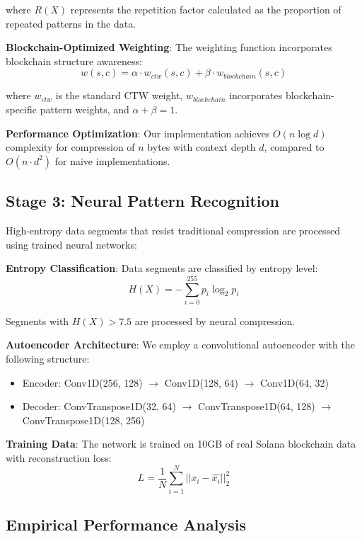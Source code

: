 \documentclass[11pt,a4paper]{article}
\begin{document}
where $R(X)$ represents the repetition factor calculated as the proportion of repeated patterns in the data.

\textbf{Blockchain-Optimized Weighting}: The weighting function incorporates blockchain structure awareness:
\begin{equation}
w(s, c) = \alpha \cdot w_{ctw}(s, c) + \beta \cdot w_{blockchain}(s, c)
\end{equation}

where $w_{ctw}$ is the standard CTW weight, $w_{blockchain}$ incorporates blockchain-specific pattern weights, and $\alpha + \beta = 1$.

\textbf{Performance Optimization}: Our implementation achieves $O(n \log d)$ complexity for compression of $n$ bytes with context depth $d$, compared to $O(n \cdot d^2)$ for naive implementations.

\subsection{Stage 3: Neural Pattern Recognition}

High-entropy data segments that resist traditional compression are processed using trained neural networks:

\textbf{Entropy Classification}: Data segments are classified by entropy level:
\begin{equation}
H(X) = -\sum_{i=0}^{255} p_i \log_2 p_i
\end{equation}

Segments with $H(X) > 7.5$ are processed by neural compression.

\textbf{Autoencoder Architecture}: We employ a convolutional autoencoder with the following structure:
\begin{itemize}
\item Encoder: Conv1D(256, 128) $\rightarrow$ Conv1D(128, 64) $\rightarrow$ Conv1D(64, 32)
\item Decoder: ConvTranspose1D(32, 64) $\rightarrow$ ConvTranspose1D(64, 128) $\rightarrow$ ConvTranspose1D(128, 256)
\end{itemize}

\textbf{Training Data}: The network is trained on 10GB of real Solana blockchain data with reconstruction loss:
\begin{equation}
L = \frac{1}{N} \sum_{i=1}^{N} ||x_i - \hat{x_i}||_2^2
\end{equation}

\subsection{Empirical Performance Analysis}
\end{document}
